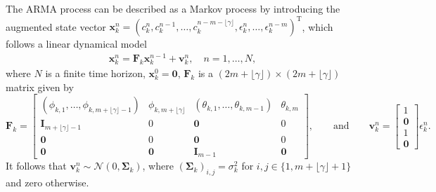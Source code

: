 \documentclass[12pt]{article} %
\begin{document}
The ARMA process can be described as a Markov process by introducing the augmented state vector
$\boldsymbol{x}_k^n=(c_k^n, c_k^{n-1}, \ldots, c_k^{n-m-\lfloor\gamma\rfloor}, \epsilon_k^{n}, \ldots, \epsilon_k^{n-m})^\mathrm{T}$, which follows a linear dynamical model
\begin{align}\label{MP}
    \boldsymbol{x}_k^n = \mathbf{F}_k\boldsymbol{x}_k^{n-1}+\boldsymbol{v}_k^n, \quad n = 1, \ldots, N,
\end{align}
where $N$ is a finite time horizon, $\boldsymbol{x}_k^0 = \boldsymbol{0}$, $\mathbf{F}_k$ is a $(2m+\lfloor\gamma\rfloor)\times (2m+\lfloor\gamma\rfloor)$ matrix given by
\[
    \mathbf{F}_k = \begin{bmatrix}
        (\phi_{k,1}, \ldots, \phi_{k,m+\lfloor\gamma\rfloor-1}) & \phi_{k, m+\lfloor\gamma\rfloor} & (\theta_{k,1},\ldots, \theta_{k, m-1}) & \theta_{k,m} \\
        \mathbf{I}_{m+\lfloor\gamma\rfloor-1} & 0 & \boldsymbol{0} & 0 \\
        \boldsymbol{0} & 0 & \boldsymbol{0} & 0 \\
        \mathbf{0} & \mathbf{0} & \mathbf{I}_{m-1} & \mathbf{0}
    \end{bmatrix}, \qquad \text{and}\qquad \boldsymbol{v}_k^{n}=\begin{bmatrix}
     1\\ \boldsymbol{0} \\ 1 \\  \boldsymbol{0} 
    \end{bmatrix}  \epsilon_k^n .
\]
It follows that $\boldsymbol{v}_k^n\sim\mathcal{N}(0, \boldsymbol{\Sigma}_k)$,  where  $(\boldsymbol{\Sigma}_k)_{i,j}=\sigma_k^2$ for $i,j\in\{1,m+\lfloor\gamma\rfloor+1\}$ and zero otherwise.
\medskip
\end{document}
